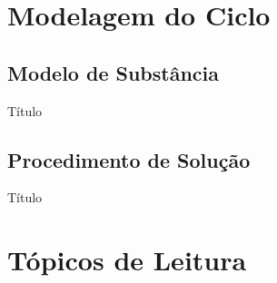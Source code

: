 \section{Modelagem do Ciclo}

\subsection{Modelo de Substância}

    \begin{frame}{Título}\vspace*{-2em}
    \end{frame}

\subsection{Procedimento de Solução}

    \begin{frame}{Título}\vspace*{-2em}
    \end{frame}

\section{Tópicos de Leitura}

